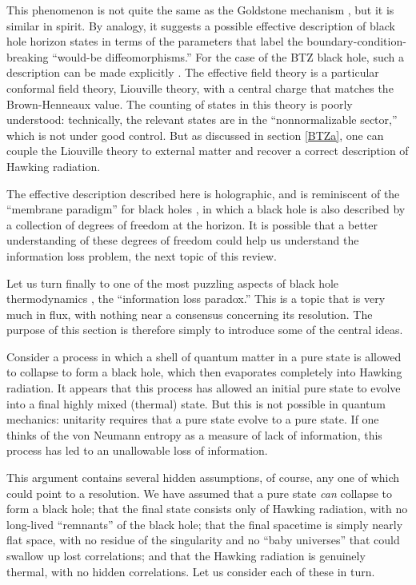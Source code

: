 \documentclass[12pt]{article}
\makeatletter
\def\section{\@startsection{section}{1}{\z@}{3.5ex plus 1ex minus
   .2ex}{2.3ex plus .2ex}{\large\bf}}
\makeatother
\begin{document}
This phenomenon is not quite the same as the Goldstone mechanism
\cite{Goldstone}, but it is similar in spirit.  By analogy, it suggests a 
possible effective description of black hole horizon states in terms of 
the parameters that label the boundary-condition-breaking ``would-be
diffeomorphisms.''  For the case of the BTZ black hole, such a
description can be made explicitly \cite{CarlipBTZb,Carlipasymp}.  
The effective field theory is a particular conformal field theory, Liouville 
theory, with a central charge that matches the Brown-Henneaux value.  
The counting of states in this theory is poorly understood: technically,
the relevant states are in the ``nonnormalizable sector,'' which is not
under good control.  But as discussed in section \ref{BTZa}, one can 
couple the Liouville theory to external matter and recover a correct
description of Hawking radiation.

The effective description described here is holographic, and
is reminiscent of the ``membrane paradigm'' for black holes 
\cite{membrane,Parikhz}, in which a black hole is also described by 
a collection of degrees of freedom at the horizon.  It is possible
that a better understanding of these degrees of freedom could
help us understand the information loss problem, the next
topic of this review.

\section{The information loss problem}

Let us turn finally to one of the most puzzling aspects of black hole
thermodynamics \cite{Hawking_info}, the ``information loss paradox.''  
This is a topic that is very much in flux, with nothing near a consensus 
concerning its resolution.  The purpose of this section is therefore 
simply to introduce some of the central ideas.

Consider a process in which a shell of quantum matter in a pure state 
is allowed to collapse to form a black hole, which then evaporates
completely into Hawking radiation.  It appears that this process has
allowed an initial pure state to evolve into a final highly mixed
(thermal) state.  But this is not possible in quantum mechanics:
unitarity requires that a pure state evolve to a pure state.  If one
thinks of the von Neumann entropy as a measure of lack of information,
this process has led to an unallowable loss of information.

This argument contains several hidden assumptions, of course, any
one of which could point to a resolution.  We have assumed that a
pure state \emph{can} collapse to form a black hole; that the final
state consists only of Hawking radiation, with no long-lived  
``remnants'' of the black hole; that the final spacetime is simply
nearly flat space, with no residue of the singularity and no
``baby universes'' that could swallow up lost correlations; and
that the Hawking radiation is genuinely thermal, with no hidden
correlations.  Let us consider each of these in turn.
\end{document}
